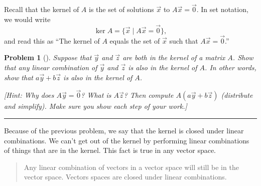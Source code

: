 \documentclass[letterpaper,oneside]{book}%
\theoremstyle{plain}
\theoremstyle{box}
\theoremstyle{problem}
\newtheorem{problemnum}{Problem}[chapter]
\newenvironment{problem}[1][]{\begin{problemnum}[#1]}{\end{problemnum}\nopagebreak\hrule\bigskip}
\begin{document}
 Recall that the kernel of $A$ is the set of solutions $\vec x$ to $A\vec x = \vec 0$.  In set notation, we would write 
$$\ker A = \{\vec x \mid A\vec x=\vec 0\},$$
and read this as ``The kernel of $A$ equals the set of $\vec x$ such that $A\vec x = \vec 0$.''

\begin{problem}

Suppose that $\vec y$ and $\vec z$ are both in the kernel of a matrix $A$. Show that any linear combination of $\vec y$ and $\vec z$ is also in the kernel of $A$. In other words, show that $a\vec y+b\vec z$ is also in the kernel of $A$. 

[Hint: Why does $A\vec y=\vec 0$? What is $A\vec z$? Then compute $A(a\vec y+b\vec z)$ (distribute and simplify). Make sure you show each step of your work.]  
\end{problem}

Because of the previous problem, we say that the kernel is closed under linear combinations. We can't get out of the kernel by performing linear combinations of things that are in the kernel. This fact is true in any vector space. \begin{quote}
Any linear combination of vectors in a vector space will still be in the vector space. Vectors spaces are closed under linear combinations.   
\end{quote}
 
 
 
\end{document}
